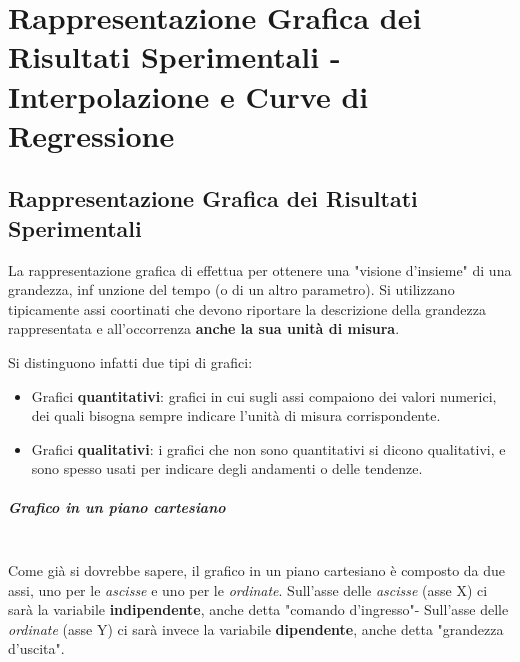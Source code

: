 \documentclass[a4paper,11pt]{report}
\begin{document}
\chapter{Rappresentazione Grafica dei Risultati Sperimentali - Interpolazione e Curve di Regressione}
\section{Rappresentazione Grafica dei Risultati Sperimentali}
La rappresentazione grafica di effettua per ottenere una "visione d'insieme" di una grandezza, inf unzione del tempo (o di un altro parametro). Si utilizzano tipicamente assi coortinati che devono riportare la descrizione della grandezza rappresentata e all'occorrenza \textbf{anche la sua unità di misura}.

Si distinguono infatti due tipi di grafici:
\begin{itemize}
  \item Grafici \textbf{quantitativi}: grafici in cui sugli assi compaiono dei valori numerici, dei quali bisogna sempre indicare l'unità di misura corrispondente.
  \item Grafici \textbf{qualitativi}: i grafici che non sono quantitativi si dicono qualitativi, e sono spesso usati per indicare degli andamenti o delle tendenze.
\end{itemize}
\paragraph{Grafico in un piano cartesiano}~\\
Come già si dovrebbe sapere, il grafico in un piano cartesiano è composto da due assi, uno per le \textit{ascisse} e uno per le \textit{ordinate}. Sull'asse delle \textit{ascisse} (asse X) ci sarà la variabile \textbf{indipendente}, anche detta "comando d'ingresso"- Sull'asse delle \textit{ordinate} (asse Y) ci sarà invece la variabile \textbf{dipendente}, anche detta "grandezza d'uscita".
\end{document}
